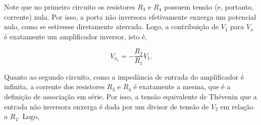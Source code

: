 \documentclass{article}
\numberwithin{equation}{section}
\newlength\Colsep
\let\dfr\dfrac
\begin{document}
\noindent\begin{minipage}{\textwidth}
\centering
\begin{minipage}[c][5cm][c]{\dimexpr0.5\textwidth-0.5\Colsep\relax}
    \begin{center}
    \end{center}
\end{minipage} \hfill
\begin{minipage}[c][5cm][c]{\dimexpr0.5\textwidth-0.5\Colsep\relax}
    \begin{center}
    \end{center}
\end{minipage}
\end{minipage}

\noindent Note que no primeiro circuito os resistores $R_3$ e $R_4$ possuem tensão (e, portanto, corrente) nula. Por isso, a porta não inversora efetivamente enxerga um potencial nulo, como se estivesse diretamente aterrada. Logo, a contribuição de $V_1$ para $V_o$ é exatamente um amplificador inversor, isto é,

\begin{equation}
    V_{o_1} = -\dfr{R_2}{R_1} V_1.
\end{equation}

\noindent Quanto ao segundo circuito, como a impedância de entrada do amplificador é infinita, a corrente dos resistores $R_3$ e $R_4$ é exatamente a mesma, que é a definição de associação em série. Por isso, a tensão equivalente de Thévenin que a entrada não inversora enxerga é dada por um divisor de tensão de $V_2$ em relação a $R_4$. Logo,
\end{document}
